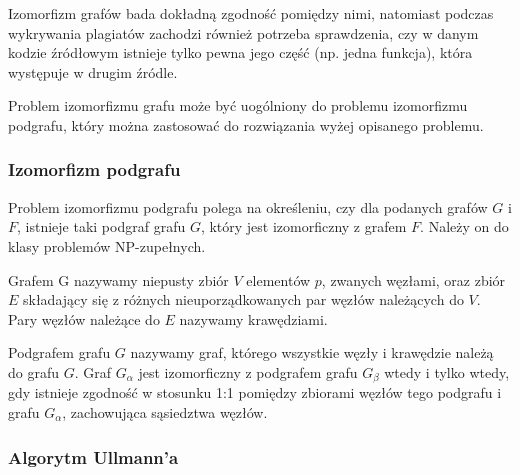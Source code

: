 \documentclass[a4paper,12pt,twoside]{article}
\begin{document}
Izomorfizm grafów bada dokładną zgodność pomiędzy nimi, natomiast podczas wykrywania plagiatów zachodzi również potrzeba sprawdzenia, czy w danym kodzie źródłowym istnieje tylko pewna jego część (np. jedna funkcja), która występuje w drugim źródle.

Problem izomorfizmu grafu może być uogólniony do problemu izomorfizmu podgrafu, który można zastosować do rozwiązania wyżej opisanego problemu.

\pagebreak

\subsubsection{Izomorfizm podgrafu} 

Problem izomorfizmu podgrafu polega na określeniu, czy dla podanych grafów $G$ i $F$, istnieje taki podgraf grafu $G$, który jest izomorficzny z grafem $F$. Należy on do klasy problemów NP-zupełnych.

Grafem G nazywamy niepusty zbiór $V$ elementów $p$, zwanych węzłami, oraz zbiór $E$ składający się z różnych nieuporządkowanych par węzłów należących do $V$. Pary węzłów należące do $E$ nazywamy krawędziami.

Podgrafem grafu $G$ nazywamy graf, którego wszystkie węzły i krawędzie należą do grafu $G$. Graf $G_\alpha$ jest izomorficzny z podgrafem grafu $G_\beta$ wtedy i tylko wtedy, gdy istnieje zgodność w stosunku 1:1 pomiędzy zbiorami węzłów tego podgrafu i grafu $G_\alpha$, zachowująca sąsiedztwa węzłów\cite{ullmann}.

\subsubsection{Algorytm Ullmann'a}
\end{document}
